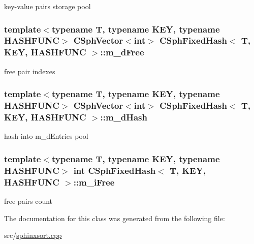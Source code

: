 key-\/value pairs storage pool 

\hypertarget{classCSphFixedHash_aa2d34730efe0f159b46fce97f473a4ba}{
\subsubsection[{m\-\_\-d\-Free}]{\setlength{\rightskip}{0pt plus 5cm}template$<$typename T, typename K\-E\-Y, typename H\-A\-S\-H\-F\-U\-N\-C$>$ {\bf C\-Sph\-Vector}$<${\bf int}$>$ {\bf C\-Sph\-Fixed\-Hash}$<$ T, K\-E\-Y, H\-A\-S\-H\-F\-U\-N\-C $>$\-::m\-\_\-d\-Free\hspace{0.3cm}{\ttfamily [protected]}}}\label{classCSphFixedHash_aa2d34730efe0f159b46fce97f473a4ba}


free pair indexes 

\hypertarget{classCSphFixedHash_abda07cbb047e51558be3f0b34826f72e}{
\subsubsection[{m\-\_\-d\-Hash}]{\setlength{\rightskip}{0pt plus 5cm}template$<$typename T, typename K\-E\-Y, typename H\-A\-S\-H\-F\-U\-N\-C$>$ {\bf C\-Sph\-Vector}$<${\bf int}$>$ {\bf C\-Sph\-Fixed\-Hash}$<$ T, K\-E\-Y, H\-A\-S\-H\-F\-U\-N\-C $>$\-::m\-\_\-d\-Hash\hspace{0.3cm}{\ttfamily [protected]}}}\label{classCSphFixedHash_abda07cbb047e51558be3f0b34826f72e}


hash into m\-\_\-d\-Entries pool 

\hypertarget{classCSphFixedHash_a3c34e89a7a12eb42ad09728e3de09851}{
\subsubsection[{m\-\_\-i\-Free}]{\setlength{\rightskip}{0pt plus 5cm}template$<$typename T, typename K\-E\-Y, typename H\-A\-S\-H\-F\-U\-N\-C$>$ {\bf int} {\bf C\-Sph\-Fixed\-Hash}$<$ T, K\-E\-Y, H\-A\-S\-H\-F\-U\-N\-C $>$\-::m\-\_\-i\-Free\hspace{0.3cm}{\ttfamily [protected]}}}\label{classCSphFixedHash_a3c34e89a7a12eb42ad09728e3de09851}


free pairs count 



The documentation for this class was generated from the following file\-:\begin{DoxyCompactItemize}
\item 
src/\hyperlink{sphinxsort_8cpp}{sphinxsort.\-cpp}\end{DoxyCompactItemize}
